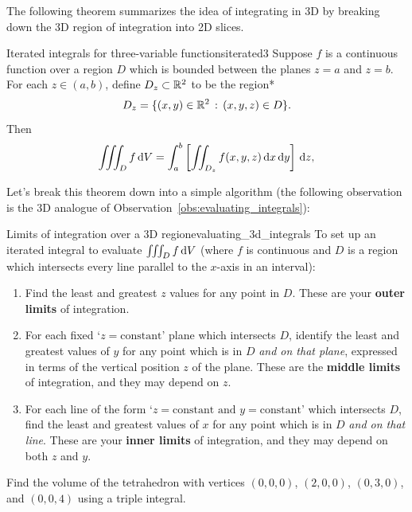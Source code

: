 \documentclass[prettycode,shellescape]{watsonbook}
\begin{document}
The following theorem summarizes the idea of integrating in 3D by
breaking down the 3D region of integration into 2D slices.

\begin{theo}{Iterated integrals for three-variable functions}{iterated3}
  Suppose $f$ is a continuous function over a region $D$ which is
  bounded between the planes $z = a$ and $z = b$. For each
  $z \in (a,b)$, define $D_z \subset \mathbb{R}^2$ to be the region*
  \[
    D_z = \{(x,y) \in \mathbb{R}^2 \, : \, (x,y,z) \in D\}. 
  \]
  Then
  \[
    \iiint _D f \, {\mathrm{d}}V =
    \int_a^b \left[\iint_{D_z} f(x,y,z) \, \mathrm{d} x \, \mathrm{d} y \right] \, {\mathrm{d}}z, 
  \]
\end{theo}

Let's break this theorem down into a simple algorithm (the following
observation is the 3D analogue of
Observation~\ref{obs:evaluating_integrals}):

\begin{obs}{Limits of integration over a 3D
    region}{evaluating_3d_integrals}
  To set up an iterated integral to evaluate $\iiint_D f \, {\mathrm{d}}V$
  (where $f$ is continuous and $D$ is a region which intersects every
  line parallel to the $x$-axis in an interval): 
  \begin{enumerate}[itemsep=3pt, topsep = 8pt, leftmargin = 12pt]
  \item Find the least and greatest $z$ values for any point in
    $D$. These are your \textbf{outer limits} of integration. 
  \item For each fixed `$z=\text{constant}$' plane which intersects $D$, identify
    the least and greatest values of $y$ for any point which is in $D$
    \textit{and on that plane}, expressed in terms of the vertical
    position $z$ of the plane. These are the \textbf{middle limits} of
    integration, and they may depend on $z$.
  \item For each line of the form
    `$z=\text{constant and }y=\text{constant}$' which intersects $D$,
    find the least and greatest values of $x$ for any point which is
    in $D$ \textit{and on that line}. These are your \textbf{inner
      limits} of integration, and they may depend on both $z$ and $y$.
  \end{enumerate}
\end{obs}

\begin{example}{}{}
  Find the volume of the tetrahedron with vertices $(0,0,0)$,
  $(2,0,0)$, $(0,3,0)$, and $(0,0,4)$ using a triple integral.
\end{example}
\end{document}
